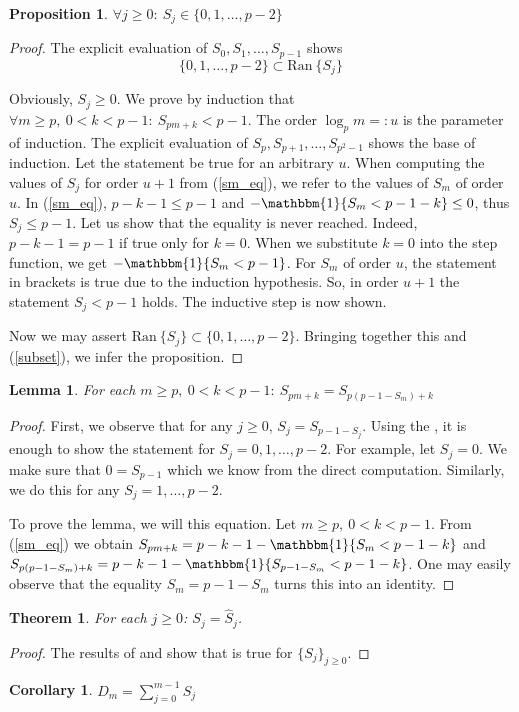 \documentclass[a4paper]{article}
\theoremstyle{plain}
\newtheorem{theorem}{Theorem}[section]
\newtheorem{lemma}{Lemma}[section]
\newtheorem{proposition}{Proposition}[section]
\newtheorem{corollary}{Corollary}[section]
\theoremstyle{definition}
\begin{document}
\begin{proposition} \label{sm_estimate}
$\forall j \ge 0:\ S_j \in \{0, 1, \ldots, p-2\}$
\end{proposition}
\begin{proof}
The explicit evaluation of $S_0, S_1, \ldots, S_{p-1}$ shows 
\begin{equation}\label{subset}
\{0,1,\ldots,p-2\} \subset \mathrm{Ran\ } \{S_j\}
\end{equation}

Obviously, $S_j \ge 0$.
We prove by induction that $\forall m \ge p,\ 0 < k < p-1:\ S_{pm+k} < p-1$. The order $\log_p m =: u $ is the parameter of induction. The explicit evaluation of $S_p, S_{p+1}, \ldots, S_{p^2-1}$ shows the base of induction. Let the statement be true for an arbitrary $u$. When computing the values of $S_j$ for order $u+1$ from (\ref{sm_eq}), we refer to the values of $S_m$ of order $u$. In (\ref{sm_eq}), $p-k-1 \le p-1$ and $- \mathbbm{1}\{S_m < p-1-k\} \le 0$, thus $S_j \le p-1$. Let us show that the equality is never reached. Indeed, $p-k-1 = p-1$ if true only for $k=0$. When we substitute $k=0$ into the step function, we get $- \mathbbm{1}\{S_m < p-1\}$. For $S_m$ of order $u$, the statement in brackets is true due to the induction hypothesis. So, in order $u+1$ the statement $S_j < p-1$ holds. The inductive step is now shown.

Now we may assert $\mathrm{Ran}\ \{S_j\} \subset \{0,1,\ldots,p-2\}$. Bringing together this and (\ref{subset}), we infer the proposition.
\end{proof}
\begin{lemma} \label{sm2}
For each $m \ge p,\ 0 < k < p-1:\ S_{pm+k}=S_{p(p-1-S_m)+k}$
\end{lemma}
\begin{proof}
First, we observe that for any $j \ge 0$, $S_j = S_{p-1 - S_j}$. Using the , it is enough to show the statement for $S_j=0,1,\ldots,p-2$. For example, let $S_j=0$. We make sure that $0 = S_{p-1}$ which we know from the direct computation. Similarly, we do this for any $S_j=1,\ldots,p-2$.

To prove the lemma, we will this equation. Let $m \ge p,\ 0 < k < p-1$. From (\ref{sm_eq}) we obtain $S_{pm+k}=p-k-1 - \mathbbm{1}\{S_m < p-1-k\}$ and $S_{p(p-1-S_m)+k}= p-k-1 - \mathbbm{1}\{S_{p-1-S_m} < p-1-k\}$. One may easily observe that the equality $S_m=p-1-S_m$ turns this into an identity.
\end{proof}
\begin{theorem} \label{subst_th}
For each $j \ge 0$: $S_j=\hat{S}_j$.
\end{theorem}
\begin{proof}
The results of  and  show that  is true for $\{S_j\}_{j \ge 0}$.
\end{proof}
\begin{corollary}
$D_m = \sum\limits_{j=0}^{m-1} \hat{S}_j$
\end{corollary}
\end{document}
